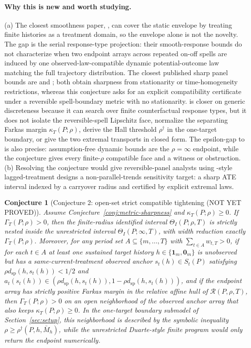 \documentclass[11pt]{article}
\newcommand{\calR}{\mathcal{R}}
\theoremstyle{definition}
\theoremstyle{plain}
\newtheorem{conjecture}{Conjecture}
\theoremstyle{remark}
\begin{document}
\paragraph{Why this is new and worth studying.}
(a) The closest smoothness paper, \citet{KimKwonKwonLee2018}, can cover the static envelope by treating finite histories as a treatment domain, so the envelope alone is not the novelty.  The gap is the serial response-type projection: their smooth-response bounds do not characterize when two endpoint arrays across repeated on-off spells are induced by one observed-law-compatible dynamic potential-outcome law matching the full trajectory distribution.  The closest published sharp panel bounds are \citet{ChernozhukovFernandezValHahnNewey2013} and \citet{JunLeeShin2016}; both obtain sharpness from stationarity or time-homogeneity restrictions, whereas this conjecture asks for an explicit compatibility certificate under a reversible spell-boundary metric with no stationarity.  \citet{DuarteFinkelsteinKnoxMummoloShpitser2024} is closer on generic discreteness because it can search over finite counterfactual response types, but it does not isolate the reversible-spell Lipschitz face, normalize the separating Farkas margin \(\kappa_T(P;\rho)\), derive the Hall threshold \(\rho^\dagger\) in the one-target boundary, or give the two extremal transports in closed form.  The epsilon-gap to \citet{DiemerShiSwanson2024} is also precise: assumption-free dynamic bounds are the \(\rho=\infty\) endpoint, while the conjecture gives every finite-\(\rho\) compatible face and a witness or obstruction.  (b) Resolving the conjecture would give reversible-panel analysts using \citet{DeChaisemartinDHaultfoeuille2024}-style lagged-treatment designs a non-parallel-trends sensitivity target: a sharp ATE interval indexed by a carryover radius and certified by explicit extremal laws.

\begin{conjecture}[Conjecture 2: open-set strict compatible tightening (NOT YET PROVED)]\label{conj:strict-tightening}
Assume Conjecture~\ref{conj:metric-sharpness} and \(\kappa_T(P;\rho)\ge 0\).  If \(\Gamma_T(P;\rho)>0\), then the finite-radius identified interval \(\Theta_I(P;\rho,T)\) is strictly nested inside the unrestricted interval \(\Theta_I(P;\infty,T)\), with width reduction exactly \(\Gamma_T(P;\rho)\).  Moreover, for any period set \(A\subseteq\{m,\ldots,T\}\) with \(\sum_{t\in A}w_{t,T}>0\), if for each \(t\in A\) at least one sustained target history \(h\in\{\mathbf{1}_m,\mathbf{0}_m\}\) is unobserved but has a same-current-treatment observed anchor \(s_t(h)\in S_t(P)\) satisfying \(\rho d_{\mathrm{sp}}(h,s_t(h))<1/2\) and \(a_t(s_t(h))\in(\rho d_{\mathrm{sp}}(h,s_t(h)),1-\rho d_{\mathrm{sp}}(h,s_t(h)))\), and if the endpoint array has strictly positive Farkas margin in the relative affine hull of \(\calR(P,\rho,T)\), then \(\Gamma_T(P;\rho)>0\) on an open neighborhood of the observed anchor array that also keeps \(\kappa_T(P;\rho)\ge 0\).  In the one-target boundary submodel of Section~\ref{sec:setup}, this neighborhood is described by the symbolic inequality \(\rho\ge \rho^\dagger(P,h,\bar M_h)\), while the unrestricted Duarte-style finite program would only return the endpoint numerically.
\end{conjecture}
\end{document}
